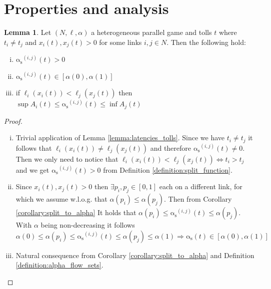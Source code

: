 \documentclass[10pt,a4paper]{book}
\newcommand{\as}{\mathrm{\alpha_s}}
\theoremstyle{definition}
\newtheorem{lemma}[definition]{Lemma}
\theoremstyle{comment}
\begin{document}
\section{Properties and analysis}

\begin{lemma}
	\label{lemma:split_basic}
	Let $(N, \ell, \alpha)$ a heterogeneous parallel game and tolls $t$ where $t_i \ne t_j$ and $x_i(t), x_j(t) > 0$ for some links $i, j \in N$.
	Then the following hold:
	\begin{enumerate}[(i)]
		\item $\as^{(i, j)}(t) > 0$
		\item $\as^{(i, j)}(t) \in [\alpha(0), \alpha(1)]$
		\item if $\ell_i(x_i(t)) < \ell_j(x_j(t))$ then
		$\sup A_i(t) \le \as^{(i, j)}(t) \le \inf A_j(t)$
	\end{enumerate}
\end{lemma}

\begin{proof}
	$ $ %
	\begin{enumerate}[(i)]
		\item Trivial application of Lemma \ref{lemma:latencies_tolls}.
		Since we have $t_i \ne t_j$ it follows that $\ell_i(x_i(t)) \ne \ell_j(x_j(t))$ and therefore $\as^{(i, j)}(t) \ne 0$.
		Then we only need to notice that $\ell_i(x_i(t)) < \ell_j(x_j(t)) \Leftrightarrow t_i > t_j$ and we get $\as^{(i, j)}(t) > 0$ from Definition \ref{definition:split_function}.
		\item Since $x_i(t), x_j(t) > 0$ then $\exists p_i, p_j \in [0, 1]$ each on a different link, for which we assume w.l.o.g. that $\alpha(p_i) \le \alpha(p_j)$.
		Then from Corollary \ref{corollary:split_to_alpha} It holds that $\alpha(p_i) \le \as^{(i, j)}(t) \le \alpha(p_j)$.
		With $\alpha$ being non-decreasing it follows
		\[\alpha(0) \le \alpha(p_i) \le \as^{(i, j)}(t) \le \alpha(p_j) \le \alpha(1) \Rightarrow \as(t) \in [\alpha(0), \alpha(1)]\]
		\item Natural consequence from Corollary \ref{corollary:split_to_alpha} and Definition \ref{definition:alpha_flow_sets}.
	\end{enumerate}
\end{proof}
\end{document}
